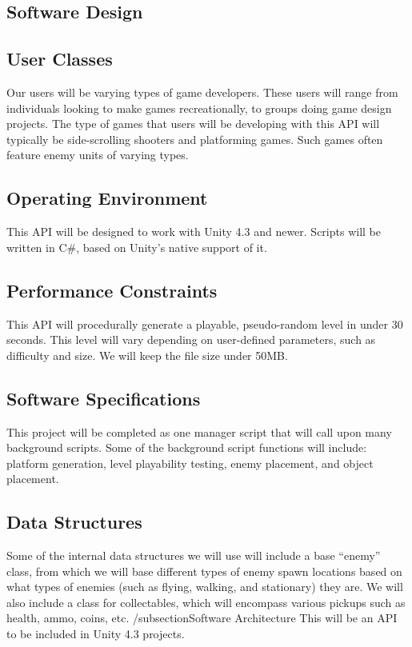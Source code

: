 \documentclass[pdftex,12pt,letter]{article}
\begin{document}
\begin{itemize}
\begin{itemize}
\begin{itemize}
\section{Software Design}
\subsection{User Classes}
Our users will be varying types of game developers. These users will range from individuals looking to make games recreationally, to groups doing game design projects. The type of games that users will be developing with this API will typically be side-scrolling shooters and platforming games. Such games often feature enemy units of varying types.
\subsection{Operating Environment}
This API will be designed to work with Unity 4.3 and newer. Scripts will be written in C#, based on Unity's native support of it.
\subsection{Performance Constraints}
This API will procedurally generate a playable, pseudo-random level in under 30 seconds. This level will vary depending on user-defined parameters, such as difficulty and size. We will keep the file size under 50MB.
\subsection{Software Specifications}
This project will be completed as one manager script that will call upon many background scripts. Some of the background script functions will include: platform generation, level playability testing, enemy placement, and object placement.
\subsection{Data Structures}
Some of the internal data structures we will use will include a base “enemy” class, from which we will base different types of enemy spawn locations based on what types of enemies (such as flying, walking, and stationary) they are. We will also include a class for collectables, which will encompass various pickups such as health, ammo, coins, etc.
/subsection{Software Architecture}
This will be an API to be included in Unity 4.3 projects.


\end{itemize}
\end{itemize}
\end{itemize}
\end{document}

